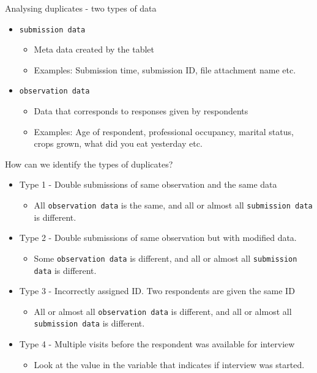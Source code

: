 \documentclass[aspectratio=169]{beamer}
\begin{document}
\begin{frame}{Analysing duplicates - two types of data}
	\begin{itemize}
		\item \texttt{submission data}
		\begin{itemize}
			\item Meta data created by the tablet
			\item Examples: Submission time, submission ID, file attachment name etc.
		\end{itemize}
		\item \texttt{observation data}
		\begin{itemize}
			\item Data that corresponds to responses given by respondents
			\item Examples: Age of respondent, professional occupancy, marital status, crops grown, what did you eat yesterday etc.
		\end{itemize}
	\end{itemize}
\end{frame}

\begin{frame}{How can we identify the types of duplicates?}
	\begin{itemize}
		\item Type 1 - Double submissions of same observation and the same data
		\begin{itemize}
			\item All \texttt{observation data} is the same, and all or almost all \texttt{submission data} is different.
		\end{itemize}
		\item Type 2 - Double submissions of same observation but with modified data.
		\begin{itemize}
			\item Some \texttt{observation data} is different, and all or almost all \texttt{submission data} is different.
		\end{itemize}
		\item Type 3 - Incorrectly assigned ID. Two respondents are given the same ID
		\begin{itemize}
			\item All or almost all \texttt{observation data} is different, and all or almost all \texttt{submission data} is different.
		\end{itemize}
		\item Type 4 - Multiple visits before the respondent was available for interview
		\begin{itemize}
			\item Look at the value in the variable that indicates if interview was started.
		\end{itemize}
	\end{itemize}
\end{frame}
\end{document}
